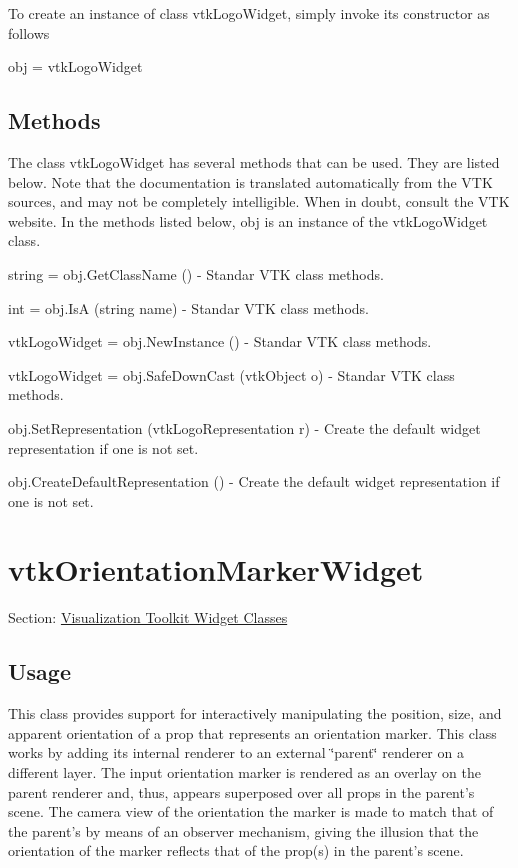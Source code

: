 To create an instance of class vtk\-Logo\-Widget, simply invoke its constructor as follows \begin{DoxyVerb}  obj = vtkLogoWidget
\end{DoxyVerb}
 \hypertarget{vtkwidgets_vtkxyplotwidget_Methods}{}\subsection{Methods}\label{vtkwidgets_vtkxyplotwidget_Methods}
The class vtk\-Logo\-Widget has several methods that can be used. They are listed below. Note that the documentation is translated automatically from the V\-T\-K sources, and may not be completely intelligible. When in doubt, consult the V\-T\-K website. In the methods listed below, {\ttfamily obj} is an instance of the vtk\-Logo\-Widget class. 
\begin{DoxyItemize}
\item {\ttfamily string = obj.\-Get\-Class\-Name ()} -\/ Standar V\-T\-K class methods.  
\item {\ttfamily int = obj.\-Is\-A (string name)} -\/ Standar V\-T\-K class methods.  
\item {\ttfamily vtk\-Logo\-Widget = obj.\-New\-Instance ()} -\/ Standar V\-T\-K class methods.  
\item {\ttfamily vtk\-Logo\-Widget = obj.\-Safe\-Down\-Cast (vtk\-Object o)} -\/ Standar V\-T\-K class methods.  
\item {\ttfamily obj.\-Set\-Representation (vtk\-Logo\-Representation r)} -\/ Create the default widget representation if one is not set.  
\item {\ttfamily obj.\-Create\-Default\-Representation ()} -\/ Create the default widget representation if one is not set.  
\end{DoxyItemize}\hypertarget{vtkwidgets_vtkorientationmarkerwidget}{}\section{vtk\-Orientation\-Marker\-Widget}\label{vtkwidgets_vtkorientationmarkerwidget}
Section\-: \hyperlink{sec_vtkwidgets}{Visualization Toolkit Widget Classes} \hypertarget{vtkwidgets_vtkxyplotwidget_Usage}{}\subsection{Usage}\label{vtkwidgets_vtkxyplotwidget_Usage}
This class provides support for interactively manipulating the position, size, and apparent orientation of a prop that represents an orientation marker. This class works by adding its internal renderer to an external \char`\"{}parent\char`\"{} renderer on a different layer. The input orientation marker is rendered as an overlay on the parent renderer and, thus, appears superposed over all props in the parent's scene. The camera view of the orientation the marker is made to match that of the parent's by means of an observer mechanism, giving the illusion that the orientation of the marker reflects that of the prop(s) in the parent's scene.

